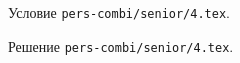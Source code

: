 \problem
Условие \texttt{pers-combi/senior/4.tex}.

\solution Решение \texttt{pers-combi/senior/4.tex}.
\endproblem
